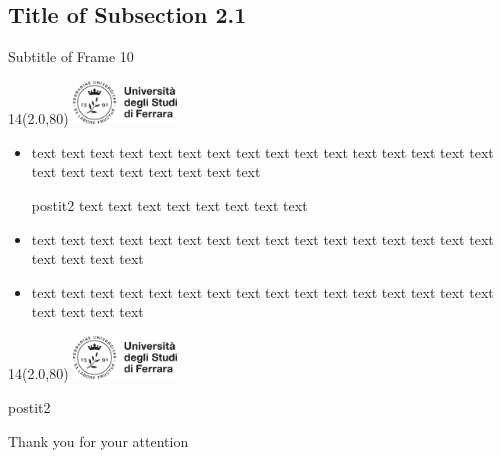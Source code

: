 \documentclass[11pt,xcolor={dvipsnames},default]{beamer} %
\newcommand{\MyLogo}{%
\begin{textblock}{14}(2.0,80)
 \includegraphics[height=1.15cm, angle=0]{logo}
\end{textblock}
}
\begin{document}
\subsection{Title of Subsection 2.1}
\begin{frame}{Subtitle of Frame 10}
\transboxin
\MyLogo
\begin{itemize}
\item<1-> text text text text text text text text text text text text text text text text text text text text text text text text
\begin{beamercolorbox}[center, shadow=false, rounded=true]{postit2}
text text text text text text text text 
\end{beamercolorbox}
\item<2->  text text text text text text text text text text text text text text text text text text text text
\item<3->  text text text text text text text text text text text text text text text text text text text text
\end{itemize}
\end{frame}

%
%


\begin{frame}
\transboxin
\MyLogo
\vspace{1.0cm}
\begin{beamercolorbox}[sep=1.0cm, center, shadow=false, rounded=true]{postit2}
\begin{Huge}Thank you for your attention\end{Huge}
\end{beamercolorbox}
\pause
\end{frame}

\fi
\end{document}
